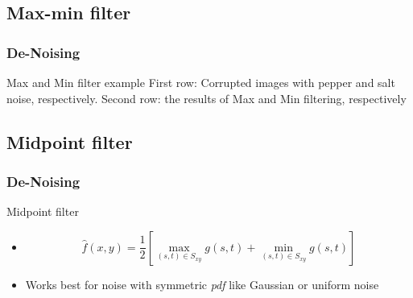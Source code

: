 \documentclass{beamer}
\begin{document}
\subsection{Max-min filter}
\begin{frame}
\frametitle{De-Noising}
\begin{block}{Max and Min filter example}
\scriptsize{First row: Corrupted images with pepper and salt noise, respectively. Second row: the results of Max and Min filtering, respectively}\\
\end{block}
\end{frame}
\subsection{Midpoint filter}
\begin{frame}
\frametitle{De-Noising}
\begin{block}{Midpoint filter}
\begin{itemize}
	\item[] $$\hat{f}(x,y) = \frac{1}{2}\left[ \max\limits_{(s,t)\in S_{xy}}{g(s,t)} + \min\limits_{(s,t)\in S_{xy}}{g(s,t)} \right]$$
	\item Works best for noise with symmetric \textit{pdf} like Gaussian or uniform noise
\end{itemize}
\end{block}		
\end{frame}
\end{document}
